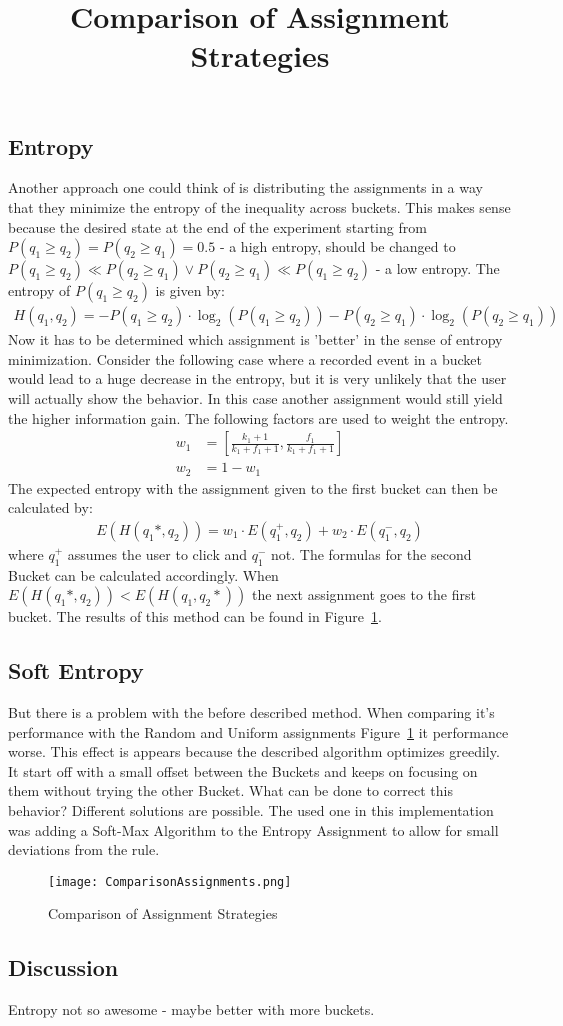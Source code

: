 \documentclass[../Thesis.tex]{subfiles}
\begin{document}
\subsection{Entropy}
Another approach one could think of is distributing the assignments in a way that they minimize the entropy of the inequality across buckets. This makes sense because the desired state at the end of the experiment starting from $P(q_1\geq q_2)=P(q_2\geq q_1)=0.5$ - a high entropy, should be changed to $P(q_1\geq q_2)\ll P(q_2\geq q_1) \lor P(q_2\geq q_1)\ll P(q_1\geq q_2)$ - a low entropy. The entropy of $P(q_1\geq q_2)$ is given by:
\begin{align*}
H(q_1,q_2) 	= - P(q_1\geq q_2) \cdot \log_2(P(q_1\geq q_2)) - P(q_2\geq q_1) \cdot \log_2(P(q_2\geq q_1))
\end{align*}
Now it has to be determined which assignment is 'better' in the sense of entropy minimization. Consider the following case where a recorded event in a bucket would lead to a huge decrease in the entropy, but it is very unlikely that the user will actually show the behavior. In this case another assignment would still yield the higher information gain. The following factors are used to weight the entropy.
\begin{align*}
w_1 &=[\frac{k_1+1}{k_1+f_1+1},\frac{f_1}{k_1+f_1+1}] \\
w_2 &=1 - w_1
\end{align*}
The expected entropy with the assignment given to the first bucket can then be calculated by:
\begin{align*}
E(H(q_1*,q_2)) = w_1\cdot E(q_1^+,q_2) + w_2\cdot E(q_1^-,q_2)
\end{align*}
where $q_1^+$ assumes the user to click and $q_1^-$ not. The formulas for the second Bucket can be calculated accordingly. When $E(H(q_1*,q_2)) < E(H(q_1,q_2*))$ the next assignment goes to the first bucket. The results of this method can be found in Figure~\ref{fig:AssignmentComp}.

\subsection{Soft Entropy}
But there is a problem with the before described method. When comparing it's performance with the Random and Uniform assignments Figure~\ref{fig:AssignmentComp} it performance worse. This effect is appears because the described algorithm optimizes greedily. It start off with a small offset between the Buckets and keeps on focusing on them without trying the other Bucket. What can be done to correct this behavior? Different solutions are possible. The used one in this implementation was adding a Soft-Max Algorithm to the Entropy Assignment to allow for small deviations from the rule.
\begin{figure}[ht]
\hfuzz=10cm
\texttt{[image: ComparisonAssignments.png]}
\centering
\title{Comparison of Assignment Strategies}
\caption{Comparison of Assignment Strategies}
\label{fig:AssignmentComp}
\end{figure}
\subsection{Discussion}
Entropy not so awesome - maybe better with more buckets.
\end{document}
